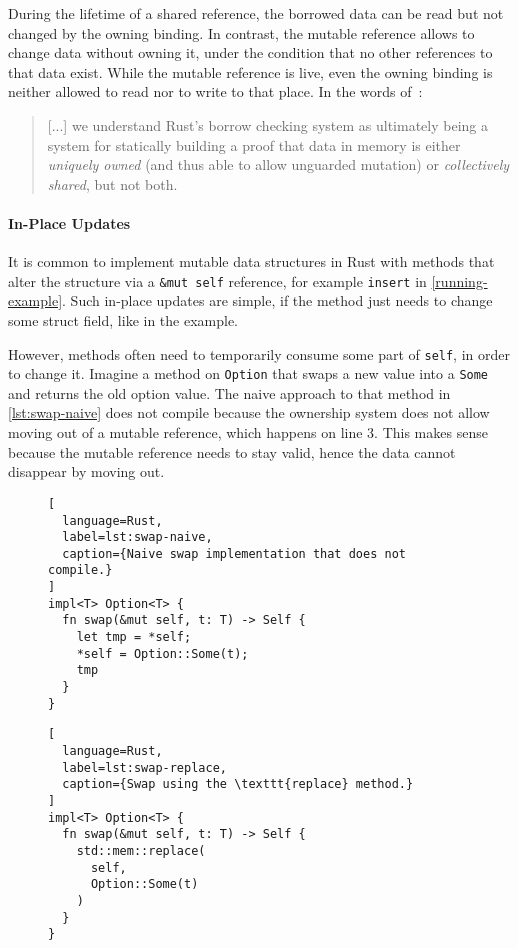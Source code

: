 During the lifetime of a shared reference, the borrowed data can be read but not
changed by the owning binding. In contrast, the mutable reference allows to
change data without owning it, under the condition that no other references to
that data exist. While the mutable reference is live, even the owning binding is
neither allowed to read nor to write to that place. In the words
of~\citet{oxide}:

\begin{quote}
{[...]} we understand Rust's borrow checking system as ultimately being a system
for statically building a proof that data in memory is either
\emph{uniquely owned} (and thus able to allow unguarded mutation) or
\emph{collectively shared}, but not both.
\end{quote}

\paragraph{In-Place Updates}

It is common to implement mutable data structures in Rust with methods that
alter the structure via a \passthrough{\lstinline!&mut self!} reference, for
example \lstinline!insert! in \autoref{running-example}. Such in-place updates
are simple, if the method just needs to change some struct field, like in the
example.

However, methods often need to temporarily consume some part of
\lstinline!self!, in order to change it. Imagine a method on \lstinline!Option!
that swaps a new value into a \lstinline!Some! and returns the old option value.
The naive approach to that method in \autoref{lst:swap-naive} does not compile
because the ownership system does not allow moving out of a mutable reference,
which happens on line 3. This makes sense because the mutable reference needs to
stay valid, hence the data cannot disappear by moving out.

\begin{figure}[hbt]
\noindent\begin{minipage}[t]{.48\textwidth}
\begin{lstlisting}[
  language=Rust,
  label=lst:swap-naive,
  caption={Naive swap implementation that does not compile.}
]
impl<T> Option<T> {
  fn swap(&mut self, t: T) -> Self {
    let tmp = *self;
    *self = Option::Some(t);
    tmp
  }
}
\end{lstlisting}
\end{minipage}\hfill
\begin{minipage}[t]{.48\textwidth}
\begin{lstlisting}[
  language=Rust,
  label=lst:swap-replace,
  caption={Swap using the \texttt{replace} method.}
]
impl<T> Option<T> {
  fn swap(&mut self, t: T) -> Self {
    std::mem::replace(
      self,
      Option::Some(t)
    )
  }
}
\end{lstlisting}
\end{minipage}
\end{figure}

